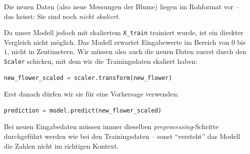 \begin{aufgabe}{3}

Die neuen Daten (also neue Messungen der Blume) liegen im Rohformat vor – das heisst: Sie sind noch \textit{nicht skaliert}.

Da unser Modell jedoch mit skaliertem \texttt{X\_train} trainiert wurde, ist ein direkter Vergleich nicht möglich. Das Modell erwartet Eingabewerte im Bereich von $0$ bis $1$, nicht in Zentimetern. Wir müssen also auch die neuen Daten zuerst durch den \texttt{Scaler} schicken, mit dem wir die Trainingsdaten skaliert haben:

\begin{lstlisting}[language=Python]
new_flower_scaled = scaler.transform(new_flower)
\end{lstlisting}

Erst danach dürfen wir sie für eine Vorhersage verwenden:

\begin{lstlisting}[language=Python]
prediction = model.predict(new_flower_scaled)
\end{lstlisting}

Bei neuen Eingabedaten müssen immer dieselben \textit{preprocessing}-Schritte durchgeführt werden wie bei den Trainingsdaten – sonst ``versteht'' das Modell die Zahlen nicht im richtigen Kontext.

\end{aufgabe}
